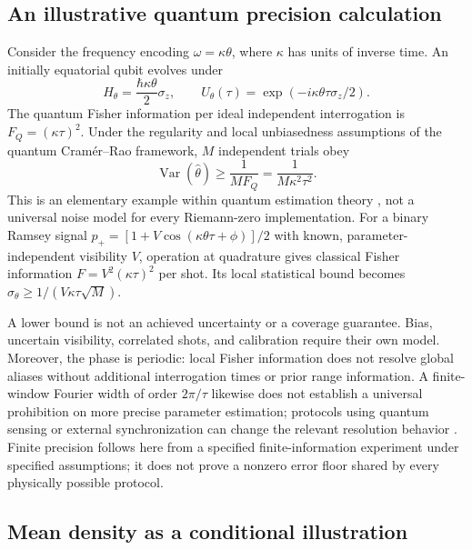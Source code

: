 \subsection{An illustrative quantum precision calculation}

Consider the frequency encoding $\omega=\kappa\theta$, where $\kappa$ has
units of inverse time. An initially equatorial qubit evolves under
\begin{equation}
 H_\theta=\frac{\hbar\kappa\theta}{2}\sigma_z,
 \qquad U_\theta(\tau)=\exp(-i\kappa\theta\tau\sigma_z/2).
\end{equation}
The quantum Fisher information per ideal independent interrogation is
$F_Q=(\kappa\tau)^2$. Under the regularity and local unbiasedness assumptions
of the quantum Cram\'er--Rao framework, $M$ independent trials obey
\begin{equation}
 \operatorname{Var}(\widehat\theta)
 \geq\frac{1}{M F_Q}
 =\frac{1}{M\kappa^2\tau^2}.
 \label{eq:ramsey_qfi}
\end{equation}
This is an elementary example within quantum estimation theory
\cite{BraunsteinCaves1994,Giovannetti2006}, not a universal noise model for
every Riemann-zero implementation. For a binary Ramsey signal
$p_+=[1+V\cos(\kappa\theta\tau+\phi)]/2$ with known, parameter-independent
visibility $V$, operation at quadrature gives classical Fisher information
$F=V^2(\kappa\tau)^2$ per shot. Its local statistical bound becomes
$\sigma_\theta\geq1/(V\kappa\tau\sqrt M)$.

A lower bound is not an achieved uncertainty or a coverage guarantee.
Bias, uncertain visibility, correlated shots, and calibration require their
own model. Moreover, the phase is periodic: local Fisher information does
not resolve global aliases without additional interrogation times or prior
range information. A finite-window Fourier width of order $2\pi/\tau$
likewise does not establish a universal prohibition on more precise parameter
estimation; protocols using quantum sensing or external synchronization can
change the relevant resolution behavior \cite{Gefen2019,Boss2017}.
Finite precision follows here from a specified finite-information
experiment under specified assumptions; it does not prove a nonzero error
floor shared by every physically possible protocol.

\subsection{Mean density as a conditional illustration}

